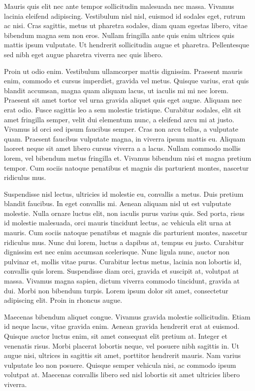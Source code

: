 Mauris quis elit nec ante tempor sollicitudin malesuada nec massa. Vivamus
lacinia eleifend adipiscing. Vestibulum nisl nisl, euismod id sodales eget,
rutrum ac nisi. Cras sagittis, metus ut pharetra sodales, diam quam egestas
libero, vitae bibendum magna sem non eros. Nullam fringilla ante quis enim
ultrices quis mattis ipsum vulputate. Ut hendrerit sollicitudin augue et
pharetra. Pellentesque sed nibh eget augue pharetra viverra nec quis libero.

Proin ut odio enim. Vestibulum ullamcorper mattis dignissim. Praesent mauris
enim, commodo et cursus imperdiet, gravida vel metus. Quisque varius, erat quis
blandit accumsan, magna quam aliquam lacus, ut iaculis mi mi nec lorem. Praesent
sit amet tortor vel urna gravida aliquet quis eget augue. Aliquam nec erat
odio. Fusce sagittis leo a sem molestie tristique. Curabitur sodales, elit sit
amet fringilla semper, velit dui elementum nunc, a eleifend arcu mi at
justo. Vivamus id orci sed ipsum faucibus semper. Cras non arcu tellus, a
vulputate quam. Praesent faucibus vulputate magna, in viverra ipsum mattis
eu. Aliquam laoreet neque sit amet libero cursus viverra a a lacus. Nullam
commodo mollis lorem, vel bibendum metus fringilla et. Vivamus bibendum nisi et
magna pretium tempor. Cum sociis natoque penatibus et magnis dis parturient
montes, nascetur ridiculus mus.

Suspendisse nisl lectus, ultricies id molestie eu, convallis a metus. Duis
pretium blandit faucibus. In eget convallis mi. Aenean aliquam nisl ut est
vulputate molestie. Nulla ornare luctus elit, non iaculis purus varius quis. Sed
porta, risus id molestie malesuada, orci mauris tincidunt lectus, ac vehicula
elit urna at mauris. Cum sociis natoque penatibus et magnis dis parturient
montes, nascetur ridiculus mus. Nunc dui lorem, luctus a dapibus at, tempus eu
justo. Curabitur dignissim est nec enim accumsan scelerisque. Nunc ligula nunc,
auctor non pulvinar et, mollis vitae purus. Curabitur lectus metus, lacinia non
lobortis id, convallis quis lorem. Suspendisse diam orci, gravida et suscipit
at, volutpat at massa. Vivamus magna sapien, dictum viverra commodo tincidunt,
gravida at dui. Morbi non bibendum turpis. Lorem ipsum dolor sit amet,
consectetur adipiscing elit. Proin in rhoncus augue.

Maecenas bibendum aliquet congue. Vivamus gravida molestie sollicitudin. Etiam
id neque lacus, vitae gravida enim. Aenean gravida hendrerit erat at
euismod. Quisque auctor luctus enim, sit amet consequat elit pretium at. Integer
et venenatis risus. Morbi placerat lobortis neque, vel posuere nibh sagittis
in. Ut augue nisi, ultrices in sagittis sit amet, porttitor hendrerit
mauris. Nam varius vulputate leo non posuere. Quisque semper vehicula nisi, ac
commodo ipsum volutpat at. Maecenas convallis libero sed nisl lobortis sit amet
ultricies libero viverra.
